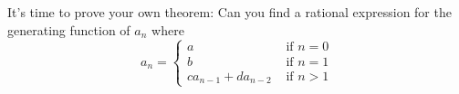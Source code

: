 It's time to prove your own theorem:
Can you find a rational expression for the generating
function of $a_n$ where
\[
a_n = 
\begin{cases}
a &\text{ if } n = 0 \\
b &\text{ if } n = 1 \\
ca_{n-1} + da_{n-2} & \text{ if } n > 1
\end{cases}
\]
